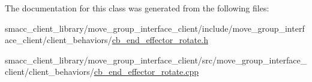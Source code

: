 The documentation for this class was generated from the following files\+:\begin{DoxyCompactItemize}
\item 
smacc\+\_\+client\+\_\+library/move\+\_\+group\+\_\+interface\+\_\+client/include/move\+\_\+group\+\_\+interface\+\_\+client/client\+\_\+behaviors/\hyperlink{cb__end__effector__rotate_8h}{cb\+\_\+end\+\_\+effector\+\_\+rotate.\+h}\item 
smacc\+\_\+client\+\_\+library/move\+\_\+group\+\_\+interface\+\_\+client/src/move\+\_\+group\+\_\+interface\+\_\+client/client\+\_\+behaviors/\hyperlink{cb__end__effector__rotate_8cpp}{cb\+\_\+end\+\_\+effector\+\_\+rotate.\+cpp}\end{DoxyCompactItemize}
